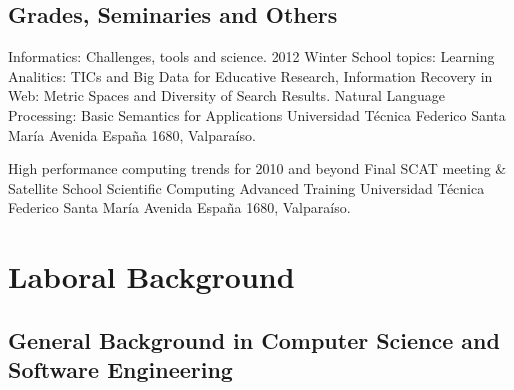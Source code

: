 \documentclass[11pt,letterpaper,roman]{moderncv}
\begin{document}
\subsection{Grades, Seminaries and Others}

	{Informatics: Challenges, tools and science.}
	{2012 Winter School}
	{topics: Learning Analitics: TICs and Big Data for Educative Research, Information Recovery in Web: Metric Spaces and Diversity of Search Results. Natural Language Processing: Basic Semantics for Applications }
	{Universidad T\'ecnica Federico Santa Mar\'ia}
	{Avenida España 1680, Valpara\'iso.}
	
	
	{High performance computing trends for 2010 and beyond}
	{Final SCAT meeting \& Satellite School}
	{Scientific Computing Advanced Training}
	{Universidad T\'ecnica Federico Santa Mar\'ia}
	{Avenida España 1680, Valpara\'iso.}


\section{Laboral Background}

\newcommand{\placetribe}{\textsc{Placetribe SpA}\xspace} 
\newcommand{\placetribeapp}{\href{http://www.placetribe.com}{Placetribe
App}\xspace} 
 
\newcommand{\ipgamma}{\textsc{Instituto Profesional de Electronica
Gamma}\xspace} 
\newcommand{\otecnewline}{\textsc{New Line Capacitación}\xspace} 
\newcommand{\ernestoquiroz}{\textsc{Escuela Ernesto Quir\'oz Weber}\xspace} 
 
\newcommand{\tchr}{Trainner\xspace} 
\newcommand{\valpo}{Valparaíso} 
\newcommand{\stgo}{Santiago} 
 
\newcommand{\se}{Software Engineer\xspace} 
\newcommand{\scd}{Software Consultant \& Developer\xspace} 
\newcommand{\sd}{Software Developer\xspace} 
\newcommand{\sarch}{Software Architect\xspace} 
\newcommand{\cf}{Co Founder\xspace} 
\newcommand{\intership}{Intern\xspace} 
\newcommand{\fdsw}[1]{Feria de Software #1 at UTFSM\xspace}      
\newcommand{\sence}{\href{http://www.sence.cl/sence/}{\textsc{SENCE}}\xspace} 
 
\newcommand{\android}{\textsl{Android}\xspace} 

\subsection{General Background in Computer Science and Software Engineering}
\end{document}
